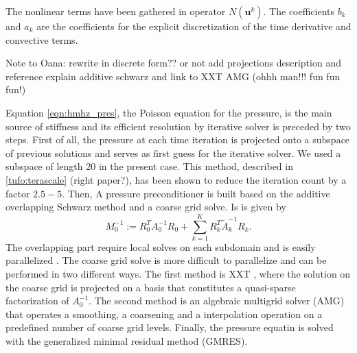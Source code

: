 \documentclass{sig-alternate}
\begin{document}
The nonlinear terms have been gathered in operator $N \left( \mathbf{u}^{k} \right)$. The coefficients $b_k$ and $a_k$ are the coefficients for the explicit discretization of the time derivative and convective terms.

Note to Oana: rewrite in discrete form?? or not
add projections description and reference
explain additive schwarz and link to XXT AMG (ohhh man!!! fun fun fun!)

Equation \ref{eqn:hmhz_pres}, the Poisson equation for the pressure, is the main source of stiffness and its efficient resolution by iterative solver is preceded by two steps. First of all, the pressure at each time iteration is projected onto a subspace of previous solutions and serves as first guess for the iterative solver. We used a subspace of length $20$ in the present case. This method, described in \ref{tufo:terascale} (right paper?), has been shown to reduce the iteration count by a factor $2.5-5$. Then, A pressure preconditioner is built based on the additive overlapping Schwarz method and a coarse grid solve. Is is given by 
\begin{equation}
 M_0^{-1} := R_0^T A_{0}^{-1} R_0 + \sum_{k=1}^{K} R_k^T \tilde{A}_k^{-1} R_k.
\end{equation}
The overlapping part require local solves on each subdomain and is easily parallelized \cite{Fischer199784,Fischer2005}. The coarse grid solve is more difficult to parallelize and can be performed in two different ways. The first method is XXT \cite{Tufo2001151}, where the solution on the coarse grid is projected on a basis that constitutes a quasi-sparse factorization of $A_0^{-1}$. The second method is an algebraic multigrid solver (AMG) that operates a smoothing, a coarsening and a interpolation operation on a predefined number of coarse grid levels. Finally, the pressure equatin is solved with the generalized minimal residual method (GMRES).
\end{document}
